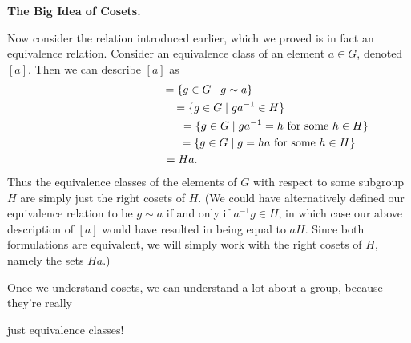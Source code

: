     \textcolor{blue!90!black!100}{\textbf{The Big Idea of Cosets.}}

    Now consider the relation introduced earlier, which we 
    proved is in fact an equivalence
    relation. Consider an equivalence class of an element $a \in G$,
    denoted $[a]$. Then we can describe $[a]$ as 
    \begin{gather*}
        [a] = \{g \in G \mid g \sim a \}\\
        \hspace{1.35cm} = \{g \in G \mid ga^{-1} \in H \}\\
        \hspace{4.2cm} = \{g \in G \mid ga^{-1} = h \text{ for some } h \in H \}\\
        \hspace{3.75cm} = \{g \in G \mid g = ha \text{ for some } h \in H \}\\
        \hspace{-1.7cm}= Ha.
    \end{gather*}
    Thus the equivalence classes of the elements of $G$ with respect
    to some subgroup $H$ are simply just the right cosets of $H$. (We
    could have alternatively defined our equivalence relation to be $g
    \sim a$ if and only if $a^{-1}g \in H$, in which case our above
    description of $[a]$ would have resulted in being equal to $aH$. Since both
    formulations are equivalent, we will simply work with the right
    cosets of $H$, namely the sets $Ha$.)

    \begin{figure}[h]
        \centering
    \end{figure}
    Once we understand cosets, we can understand a lot about a group,
    because they're really 
    
    just equivalence classes!
    \vspace{0.8cm}

